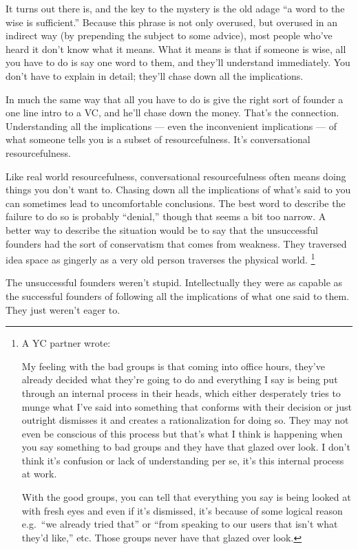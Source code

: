 \documentclass[12pt]{book}
\begin{document}
It turns out there is, and the key to the mystery is the old adage ``a
word to the wise is sufficient.'' Because this phrase is not only
overused, but overused in an indirect way (by prepending the subject to
some advice), most people who've heard it don't know what it means. What
it means is that if someone is wise, all you have to do is say one word
to them, and they'll understand immediately. You don't have to explain
in detail; they'll chase down all the implications.

In much the same way that all you have to do is give the right sort of
founder a one line intro to a VC, and he'll chase down the money. That's
the connection. Understanding all the implications --- even the
inconvenient implications --- of what someone tells you is a subset of
resourcefulness. It's conversational resourcefulness.

Like real world resourcefulness, conversational resourcefulness often
means doing things you don't want to. Chasing down all the implications
of what's said to you can sometimes lead to uncomfortable conclusions.
The best word to describe the failure to do so is probably ``denial,''
though that seems a bit too narrow. A better way to describe the
situation would be to say that the unsuccessful founders had the sort of
conservatism that comes from weakness. They traversed idea space as
gingerly as a very old person traverses the physical world.
\footnote{A YC partner wrote:

My feeling with the bad groups is that coming into office hours, they've
already decided what they're going to do and everything I say is being
put through an internal process in their heads, which either desperately
tries to munge what I've said into something that conforms with their
decision or just outright dismisses it and creates a rationalization for
doing so. They may not even be conscious of this process but that's what
I think is happening when you say something to bad groups and they have
that glazed over look. I don't think it's confusion or lack of
understanding per se, it's this internal process at work.

With the good groups, you can tell that everything you say is being
looked at with fresh eyes and even if it's dismissed, it's because of
some logical reason e.g.~``we already tried that'' or ``from speaking to
our users that isn't what they'd like,'' etc. Those groups never have
that glazed over look.}

The unsuccessful founders weren't stupid. Intellectually they were as
capable as the successful founders of following all the implications of
what one said to them. They just weren't eager to.
\end{document}
